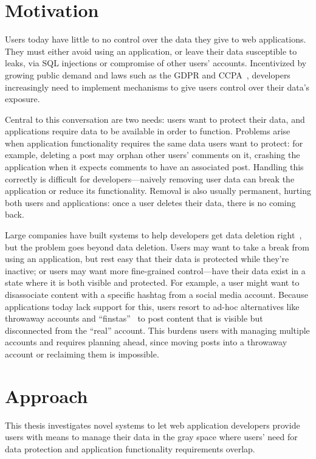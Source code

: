 \section{Motivation}
\label{sec:intro:motivation}
Users today have little to no control over the data they give to web
applications.  They must either avoid using an application, or leave their data
susceptible to leaks, \eg via SQL injections or compromise of other users'
accounts.  Incentivized by growing public demand and laws such as the GDPR and
CCPA~\cite{eu:gdpr, ccpa}, developers increasingly need to implement mechanisms
to give users control over their data’s exposure.

Central to this conversation are two needs: users want to protect their data,
and applications require data to be available in order to function. Problems
arise when application functionality requires the same data users want to
protect: for example, deleting a post may orphan other users' comments on it,
crashing the application when it expects comments to have an associated post.
Handling this correctly is difficult for developers---naively removing user data
can break the application or reduce its functionality. Removal is also usually
permanent, hurting both users and applications: once a user deletes their data,
there is no coming back.

Large companies have built systems to help developers get data deletion
right~\cite{delf}, but the problem goes beyond data deletion. Users may want to
take a break from using an application, but rest easy that their data is
protected while they’re inactive; or users may want more fine-grained
control—\ie have their data exist in a state where it is both visible and
protected. For example, a user might want to disassociate content with a
specific hashtag from a social media account. Because applications today lack
support for this, users resort to ad-hoc alternatives like throwaway accounts
and ``finstas''~\cite{reddit:throwaway, nytimes:finsta} to post content that is
visible but disconnected from the ``real'' account. This burdens users with
managing multiple accounts and requires planning ahead, since moving posts into
a throwaway account or reclaiming them is impossible.

\section{Approach}
\label{sec:intro:approach}
This thesis investigates novel systems to let web application developers provide users with
means to manage their data in the gray space where users' need for data
protection and application functionality requirements overlap.  

